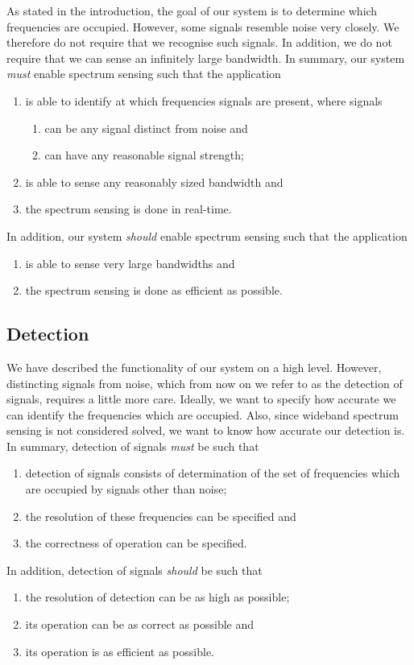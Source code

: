 \documentclass[a4paper, openany, oneside]{memoir}
\begin{document}
As stated in the introduction, the goal of our system is to determine which frequencies are occupied. However, some signals resemble noise very closely. We therefore do not require that we recognise such signals. In addition, we do not require that we can sense an infinitely large bandwidth. In summary, our system \emph{must} enable spectrum sensing such that the application
\begin{enumerate}
    \item is able to identify at which frequencies signals are present, where signals
    \begin{enumerate}
        \item can be any signal distinct from noise and
        \item can have any reasonable signal strength;
    \end{enumerate}
    \item is able to sense any reasonably sized bandwidth and
    \item the spectrum sensing is done in real-time.
\end{enumerate}
In addition, our system \emph{should} enable spectrum sensing such that the application
\begin{enumerate}
    \item is able to sense very large bandwidths and
    \item the spectrum sensing is done as efficient as possible.
\end{enumerate}

\subsection{Detection}
We have described the functionality of our system on a high level. However, distincting signals from noise, which from now on we refer to as the detection of signals, requires a little more care. Ideally, we want to specify how accurate we can identify the frequencies which are occupied. Also, since wideband spectrum sensing is not considered solved, we want to know how accurate our detection is.
In summary, detection of signals \emph{must} be such that
\begin{enumerate}
    \item detection of signals consists of determination of the set of frequencies which are occupied by signals other than noise;
    \item the resolution of these frequencies can be specified and
    \item the correctness of operation can be specified.
\end{enumerate}
In addition, detection of signals \emph{should} be such that
\begin{enumerate}
    \item the resolution of detection can be as high as possible;
    \item its operation can be as correct as possible and
    \item its operation is as efficient as possible.
\end{enumerate}
\end{document}

